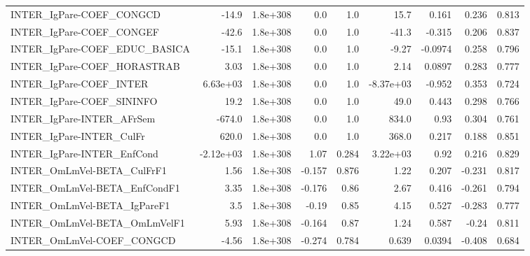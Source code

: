 \begin{tabular}{lrrrrrrrr}
INTER\_IgPare-COEF\_CONGCD              &       -14.9 &     1.8e+308 &      0.0 &      1.0 &       15.7 &       0.161 &        0.236 &         0.813 \\
INTER\_IgPare-COEF\_CONGEF              &       -42.6 &     1.8e+308 &      0.0 &      1.0 &      -41.3 &      -0.315 &        0.206 &         0.837 \\
INTER\_IgPare-COEF\_EDUC\_BASICA         &       -15.1 &     1.8e+308 &      0.0 &      1.0 &      -9.27 &     -0.0974 &        0.258 &         0.796 \\
INTER\_IgPare-COEF\_HORASTRAB           &        3.03 &     1.8e+308 &      0.0 &      1.0 &       2.14 &      0.0897 &        0.283 &         0.777 \\
INTER\_IgPare-COEF\_INTER               &    6.63e+03 &     1.8e+308 &      0.0 &      1.0 &  -8.37e+03 &      -0.952 &        0.353 &         0.724 \\
INTER\_IgPare-COEF\_SININFO             &        19.2 &     1.8e+308 &      0.0 &      1.0 &       49.0 &       0.443 &        0.298 &         0.766 \\
INTER\_IgPare-INTER\_AFrSem             &      -674.0 &     1.8e+308 &      0.0 &      1.0 &      834.0 &        0.93 &        0.304 &         0.761 \\
INTER\_IgPare-INTER\_CulFr              &       620.0 &     1.8e+308 &      0.0 &      1.0 &      368.0 &       0.217 &        0.188 &         0.851 \\
INTER\_IgPare-INTER\_EnfCond            &   -2.12e+03 &     1.8e+308 &     1.07 &    0.284 &   3.22e+03 &        0.92 &        0.216 &         0.829 \\
INTER\_OmLmVel-BETA\_CulFrF1            &        1.56 &     1.8e+308 &   -0.157 &    0.876 &       1.22 &       0.207 &       -0.231 &         0.817 \\
INTER\_OmLmVel-BETA\_EnfCondF1          &        3.35 &     1.8e+308 &   -0.176 &     0.86 &       2.67 &       0.416 &       -0.261 &         0.794 \\
INTER\_OmLmVel-BETA\_IgPareF1           &         3.5 &     1.8e+308 &    -0.19 &     0.85 &       4.15 &       0.527 &       -0.283 &         0.777 \\
INTER\_OmLmVel-BETA\_OmLmVelF1          &        5.93 &     1.8e+308 &   -0.164 &     0.87 &       1.24 &       0.587 &        -0.24 &         0.811 \\
INTER\_OmLmVel-COEF\_CONGCD             &       -4.56 &     1.8e+308 &   -0.274 &    0.784 &      0.639 &      0.0394 &       -0.408 &         0.684 \\

\end{tabular}
